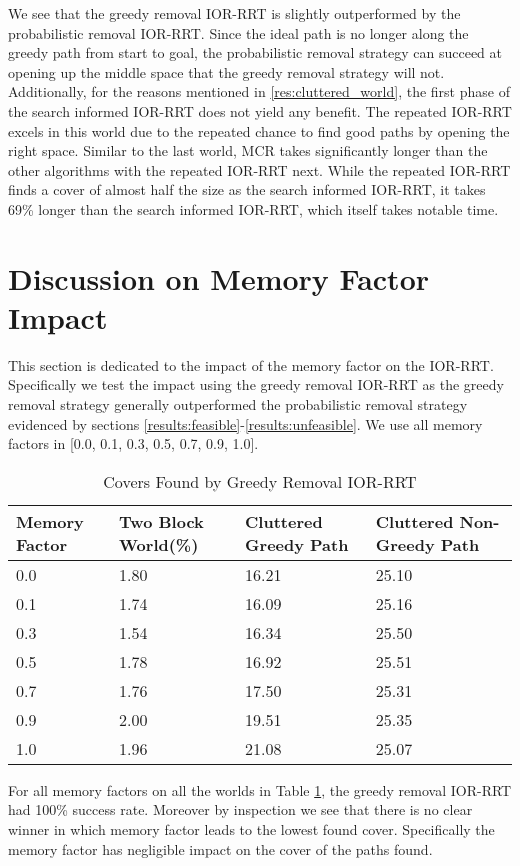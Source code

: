 We see that the greedy removal IOR-RRT is slightly outperformed by the probabilistic removal IOR-RRT. Since the ideal path is no longer along the greedy path from start to goal, the probabilistic removal strategy can succeed at opening up the middle space that the greedy removal strategy will not. Additionally, for the reasons mentioned in \ref{res:cluttered_world}, the first phase of the search informed IOR-RRT does not yield any benefit. The repeated IOR-RRT excels in this world due to the repeated chance to find good paths by opening the right space. Similar to the last world, MCR takes significantly longer than the other algorithms with the repeated IOR-RRT next. While the repeated IOR-RRT finds a cover of almost half the size as the search informed IOR-RRT, it takes 69\% longer than the search informed IOR-RRT, which itself takes notable time. 

\section{Discussion on Memory Factor Impact}
This section is dedicated to the impact of the memory factor on the IOR-RRT. Specifically we test the impact using the greedy removal IOR-RRT as the greedy removal strategy generally outperformed the probabilistic removal strategy evidenced by sections \ref{results:feasible}-\ref{results:unfeasible}. We use all memory factors in [0.0, 0.1, 0.3, 0.5, 0.7, 0.9, 1.0].

\begin{table}[h!]
\centering
\begin{tabular}{@{}llll@{}}
\toprule
Memory Factor & Two Block World(\%)  & Cluttered Greedy Path  & Cluttered Non-Greedy Path \\ 
\midrule
0.0 & 1.80 & 16.21 & 25.10 \\
0.1 & 1.74 & 16.09 & 25.16 \\
0.3 & 1.54 & 16.34 & 25.50 \\
0.5 & 1.78 & 16.92 & 25.51 \\
0.7 & 1.76 & 17.50 & 25.31 \\
0.9 & 2.00 & 19.51 & 25.35 \\ 
1.0 & 1.96 & 21.08 & 25.07 \\
\bottomrule
\end{tabular}
\caption{Covers Found by Greedy Removal IOR-RRT}
\label{tab:memory_factor_no_impact}
\end{table}

For all memory factors on all the worlds in Table \ref{tab:memory_factor_no_impact}, the greedy removal IOR-RRT had 100\% success rate. Moreover by inspection we see that there is no clear winner in which memory factor leads to the lowest found cover. Specifically the memory factor has negligible impact on the cover of the paths found. 

